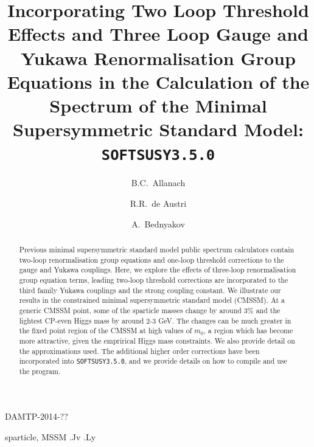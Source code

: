 \documentclass[final,3p,times,pdflatex]{elsarticle}
\begin{document}
\begin{frontmatter}

\begin{flushright}
DAMTP-2014-??
\end{flushright}

\title{Incorporating Two Loop Threshold Effects and Three Loop Gauge and
  Yukawa Renormalisation Group Equations in the Calculation of the Spectrum
  of the Minimal Supersymmetric Standard Model: {\tt SOFTSUSY3.5.0}}

\author[damtp]{B.C.~Allanach}
\author[valencia]{R.R.~de Austri}
\author[dunba]{A.~Bednyakov}

\address[damtp]{DAMTP, CMS, University of Cambridge, Wilberforce road,
  Cambridge, CB3  0WA, United Kingdom}
\address[valencia]{Instituto de Física Corpuscular | Parque Científico,
  C/Catedrático José Beltrán, 2 | E-46980 Paterna, Spain} 
\address[dubna]{Joint Institute for Nuclear Research, 141980, Dubna, Russia}

\begin{abstract}
  Previous minimal supersymmetric standard model public spectrum calculators
  contain two-loop 
  renormalisation group equations and one-loop threshold corrections to the
  gauge and Yukawa couplings. Here, we explore the effects of three-loop
  renormalisation group equation terms, leading two-loop threshold
  corrections are incorporated to the third family Yukawa couplings and the
  strong coupling constant.
  We illustrate our results in the constrained minimal supersymmetric standard
  model (CMSSM). 
  At a generic CMSSM point, some of the sparticle masses change by around
  3$\%$ and the 
  lightest CP-even Higgs mass by around 2-3 GeV. 
  The changes can be much greater in the fixed point region of the CMSSM at
  high values of $m_0$, a region which has become more attractive, given the
  emprirical Higgs mass constraints. 
  We also provide detail on the
  approximations used. The additional higher order corrections have been
  incorporated into {\tt SOFTSUSY3.5.0}, and we provide details on how to
  compile and use the program. 
\end{abstract}

\begin{keyword}
sparticle, 
MSSM
.Jv
.Ly
\end{keyword}
\end{frontmatter}
\end{document}
